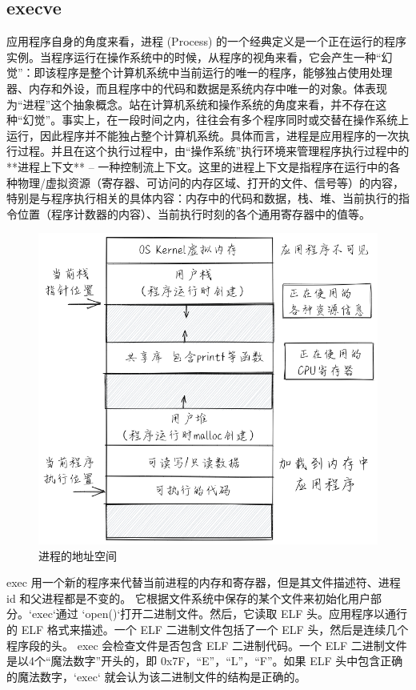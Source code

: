 \subsection{execve}
应用程序自身的角度来看，进程 (Process) 的一个经典定义是一个正在运行的程序实例。当程序运行在操作系统中的时候，从程序的视角来看，它会产生一种“幻觉”：即该程序是整个计算机系统中当前运行的唯一的程序，能够独占使用处理器、内存和外设，而且程序中的代码和数据是系统内存中唯一的对象。体表现为“进程”这个抽象概念。站在计算机系统和操作系统的角度来看，并不存在这种“幻觉”。事实上，在一段时间之内，往往会有多个程序同时或交替在操作系统上运行，因此程序并不能独占整个计算机系统。具体而言，进程是应用程序的一次执行过程。并且在这个执行过程中，由“操作系统”执行环境来管理程序执行过程中的 **进程上下文** – 一种控制流上下文。这里的进程上下文是指程序在运行中的各种物理/虚拟资源（寄存器、可访问的内存区域、打开的文件、信号等）的内容，特别是与程序执行相关的具体内容：内存中的代码和数据，栈、堆、当前执行的指令位置（程序计数器的内容）、当前执行时刻的各个通用寄存器中的值等。
\begin{figure}[htb]
    \centering
    \includegraphics[width=\textwidth]{figures/04-04-进程的地址空间.png}
    \caption{
        进程的地址空间
    }
    \label{fig:进程的地址空间}
\end{figure}

exec 用一个新的程序来代替当前进程的内存和寄存器，但是其文件描述符、进程 id 和父进程都是不变的。
它根据文件系统中保存的某个文件来初始化用户部分。`exec`通过 `open()`打开二进制文件。然后，它读取 ELF 头。应用程序以通行的 ELF 格式来描述。一个 ELF 二进制文件包括了一个 ELF 头，然后是连续几个程序段的头。
exec 会检查文件是否包含 ELF 二进制代码。一个 ELF 二进制文件是以4个“魔法数字”开头的，即 0x7F，“E”，“L”，“F”。如果 ELF 头中包含正确的魔法数字，`exec` 就会认为该二进制文件的结构是正确的。

